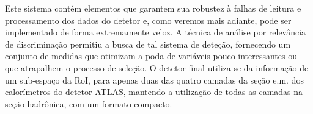 Este sistema contém elementos que garantem sua robustez à falhas de leitura e
processamento dos dados do detetor e, como veremos mais adiante, pode ser
implementado de forma extremamente veloz. A técnica de análise por relevância
de discriminação permitiu a busca de tal sistema de deteção, fornecendo um
conjunto de medidas que otimizam a poda de variáveis pouco interessantes ou
que atrapalhem o processo de seleção. O detetor final utiliza-se da informação
de um sub-espaço da RoI, para apenas duas das quatro camadas da seção e.m. dos
calorímetros do detetor ATLAS, mantendo a utilização de todas as camadas na
seção hadrônica, com um formato compacto.

